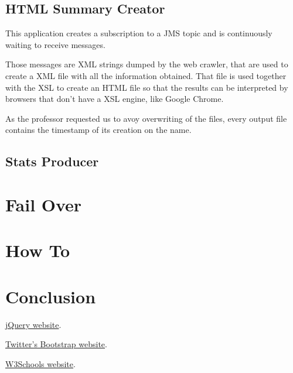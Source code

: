 \documentclass[a4paper]{article}
\begin{document}
\subsection{HTML Summary Creator}
\indent \indent This application creates a subscription to a JMS topic and is continuously waiting to receive messages.

Those messages are XML strings dumped by the web crawler, that are used to create a XML file with all the information obtained. That file is used together with the XSL to create an HTML file so that the results can be interpreted by browsers that don't have a XSL engine, like Google Chrome.

As the professor requested us to avoy overwriting of the files, every output file contains the timestamp of its creation on the name.
\clearpage

\subsection{Stats Producer}
\indent \indent

\section{Fail Over}
\indent \indent

\section{How To}
\indent \indent

\section{Conclusion}
\indent \indent 
\clearpage

\begin{thebibliography}{9}
	\href{http://jquery.com/}{jQuery website}.

	\href{http://getbootstrap.com/}{Twitter's Bootstrap website}.

	\href{http://www.w3schools.com/}{W3Schools website}.

\end{thebibliography}
\end{document}
